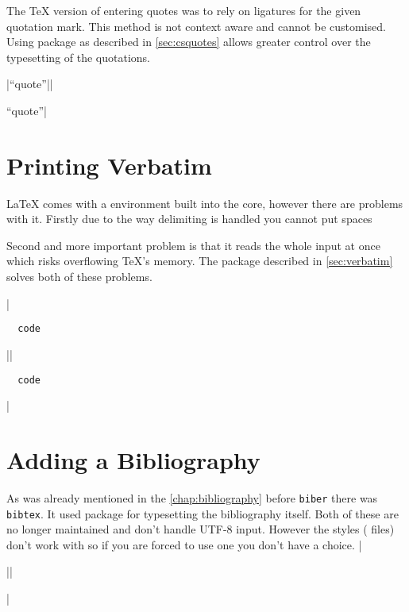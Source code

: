 The \TeX{} version of entering quotes was to rely on ligatures for the given
quotation mark. This method is not context aware and cannot be customised.
Using  package as described in \autoref{sec:csquotes} allows
greater control over the typesetting of the quotations.

\chto|``quote''||\usepackage{csquotes}
\enquote{quote}|

\section{Printing Verbatim}

\LaTeX{} comes with a  environment built into the core, however there are problems
with it. Firstly due to the way delimiting is handled you cannot put spaces
Second and more important problem is that it reads the whole input at once
which risks overflowing \TeX{}'s memory. The  package described
in \autoref{sec:verbatim} solves both of these problems.
\begin{chktexignore}
\chto|\begin{verbatim}
  code
\end{verbatim}||\usepackage{verbatim}
\begin{verbatim}
  code
\end{verbatim}|
\end{chktexignore}

\section{Adding a Bibliography}

As was already mentioned in the \autoref{chap:bibliography} before
\texttt{biber} there was \texttt{bibtex}. It used  package for
typesetting the bibliography itself. Both of these are no longer maintained and
don't handle UTF-8 input. However the  styles ( files)
don't work with  so if you are forced to use one you don't have a
choice.
\chto|\usepackage{natbib}||\usepackage{biblatex}|

\endgroup
